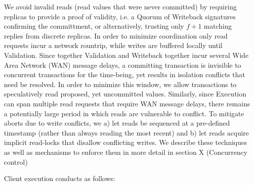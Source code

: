 We avoid invalid reads (read values that were never committed) by requiring replicas to provide a proof of validity, i.e. a Quorum of Writeback signatures  confirming the committment, or alternatively, trusting only $f+1$ matching replies from discrete replicas. In order to minimize coordination only read requests incur a network rountrip, while writes are buffered locally until Validation. 
Since together Validation and Writeback together incur several Wide Area Network (WAN) message delays, a committing transaction is invisible to concurrent transactions for the time-being, yet results in isolation conflicts that need be resolved. In order to minimize this window, we allow transactions to speculatively read proposed, yet uncommitted values. Similarly, since Execution can span multiple read requests that require WAN message delays, there remains a potentially large period in which reads are vulnerable to conflict. To mitigate aborts due to write conflicts, we a) let reads be sequenced at a pre-defined timestamp (rather than always reading the most recent) and b) let reads acquire implicit read-locks that disallow conflicting writes. We describe these techniques as well as mechanisms to enforce them in more detail in section X (Concurrency control) 



Client execution conducts as follows:

